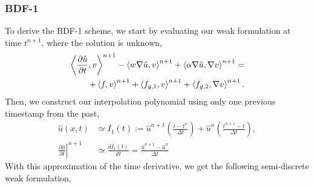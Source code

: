 \documentclass[../main.tex]{subfiles}
\newcommand{\inner}[2]{\left<#1, #2\right>}
\begin{document}
\subsubsection{BDF-1}
To derive the BDF-1 scheme, we start by evaluating our weak formulation at time $t^{n+1}$, where the solution is unknown,
\begin{equation}
    \begin{split}
        \inner{\frac{\partial \hat{u}}{\partial t}}{v}^{n+1} 
        - \inner{w \grad \hat{u}}{v}^{n+1} 
        + \inner{\alpha \grad \hat{u}}{\grad v}^{n+1} =  \\
        + \inner{f}{v}^{n+1} + \inner{f_{g,1}}{v}^{n+1} + \inner{f_{g,2}}{\grad v}^{n+1}.
    \end{split}
\end{equation}
Then, we construct our interpolation polynomial using only one previous timestamp from the past, 
\begin{align}
    \hat{u}(x,t) &\simeq I_1(t) := 
    \hat{u}^{n+1}\left( \frac{t-t^{n}}{\Delta t}  \right)
    + \hat{u}^{n}\left(\frac{t^{n+1}-t}{\Delta t}\right), \\
    \left.\frac{\partial\hat{u}}{\partial t}\right|^{n+1} &\simeq \frac{d I_1(t)}{dt} = \frac{\hat{u}^{n+1} - \hat{u}^{n}}{\Delta t}
\end{align}
With this approximation of the time derivative, we get the following semi-discrete weak formulation, 
\end{document}
